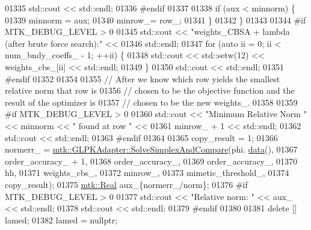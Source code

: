 \begin{DoxyCode}
{{01335       std::cout << std::endl;
01336 \textcolor{preprocessor}{      #endif}
01337 
01338       \textcolor{keywordflow}{if} (aux < minnorm) \{
01339         minnorm = aux;
01340         minrow\_= row\_;
01341       \}
01342     \}
01343 
01344 \textcolor{preprocessor}{    #if MTK\_DEBUG\_LEVEL > 0}
01345     std::cout << \textcolor{stringliteral}{"weights\_CBSA + lambda (after brute force search):"} <<
01346       std::endl;
01347     \textcolor{keywordflow}{for} (\textcolor{keyword}{auto} ii = 0; ii < num\_bndy\_coeffs\_ - 1; ++ii) \{
01348       std::cout << std::setw(12) << weights\_cbs\_[ii] << std::endl;
01349     \}
01350     std::cout << std::endl;
01351 \textcolor{preprocessor}{    #endif}
01352 
01354 
01355     \textcolor{comment}{// After we know which row yields the smallest relative norm that row is}
01356     \textcolor{comment}{// chosen to be the objective function and the result of the optimizer is}
01357     \textcolor{comment}{// chosen to be the new weights\_.}
01358 
01359 \textcolor{preprocessor}{    #if MTK\_DEBUG\_LEVEL > 0}
01360     std::cout << \textcolor{stringliteral}{"Minimum Relative Norm "} << minnorm << \textcolor{stringliteral}{" found at row "} <<
01361       minrow\_ + 1 << std::endl;
01362     std::cout << std::endl;
01363 \textcolor{preprocessor}{    #endif}
01364 
01365     copy\_result = 1;
01366     normerr\_ = \hyperlink{classmtk_1_1GLPKAdapter_a834480aca83e3c0d09fdab7fdb7e8a3f}{mtk::GLPKAdapter::SolveSimplexAndCompare}(phi.
      \hyperlink{classmtk_1_1DenseMatrix_a16b3ff56feb2658b9fc7147d1de4d8e7}{data}(),
01367                                                         order\_accuracy\_ + 1,
01368                                                         order\_accuracy\_,
01369                                                         order\_accuracy\_,
01370                                                         hh,
01371                                                         weights\_cbs\_,
01372                                                         minrow\_,
01373                                                         mimetic\_threshold\_,
01374                                                         copy\_result);
01375     \hyperlink{group__c01-roots_gac080bbbf5cbb5502c9f00405f894857d}{mtk::Real} aux\_\{normerr\_/norm\};
01376 \textcolor{preprocessor}{    #if MTK\_DEBUG\_LEVEL > 0}
01377     std::cout << \textcolor{stringliteral}{"Relative norm: "} << aux\_ << std::endl;
01378     std::cout << std::endl;
01379 \textcolor{preprocessor}{    #endif}
01380 
01381     \textcolor{keyword}{delete} [] lamed;
01382     lamed = \textcolor{keyword}{nullptr};
}}
\end{DoxyCode}
